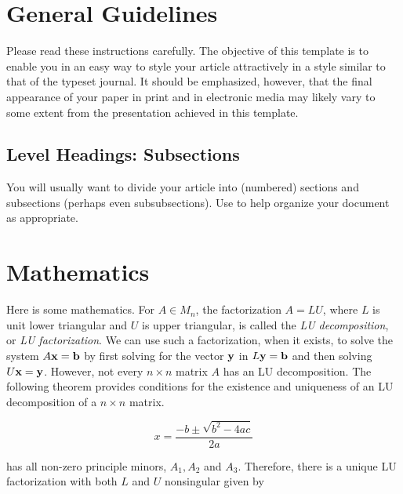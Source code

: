\newpage
\section{General Guidelines}

\noindent Please read these instructions carefully.   The objective of this template is to enable you in an easy way to style your article attractively in a style similar to that of the typeset journal. It should be emphasized, however, that the final appearance of your paper in print and in electronic media may likely vary to some extent from the presentation achieved in this template.
    
\subsection{Level Headings: Subsections}
\noindent You will usually want to divide your article into (numbered) sections and subsections (perhaps even subsubsections).  Use to help organize your document as appropriate.

\section{Mathematics}\label{sec:lu}
Here is some mathematics.  For $A \in M_n$, the factorization $A = LU$, where $L$ is unit lower triangular and $U$ is upper triangular,  is called the \textit{LU decomposition}, or \textit{LU factorization}.  We can use such a factorization, when it exists, to solve the system $A {\bf x} = {\bf b}$ by first solving for the vector $\bf{y}$ in $L {\bf y} = {\bf b}$ 
and then solving 
$
U {\bf x} = {\bf y}
$. 
However, not every $n \times n$ matrix $A$ has an LU decomposition.  The following theorem provides conditions for the existence and uniqueness of an LU decomposition of a $n \times n$ matrix.

\begin{equation}\label{eqn:quad}
x = \frac{-b \pm \sqrt{b^2 - 4ac}}{2a}
\end{equation}
  
has all non-zero principle minors, $A_1, A_2$ and $A_3$.  Therefore,  there is a unique LU factorization with both $L$ and $U$ nonsingular given by 

